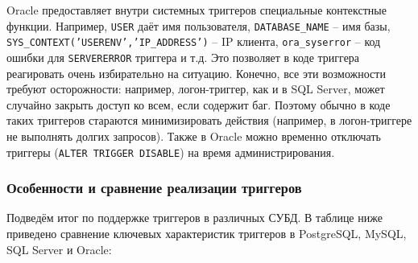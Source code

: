  Oracle предоставляет внутри системных триггеров специальные контекстные функции. Например, \texttt{USER} даёт имя пользователя, \texttt{DATABASE\_NAME} – имя базы, \texttt{SYS\_CONTEXT('USERENV','IP\_ADDRESS')} – IP клиента, \texttt{ora\_syserror} – код ошибки для \texttt{SERVERERROR} триггера и т.д. Это позволяет в коде триггера реагировать очень избирательно на ситуацию. 
 Конечно, все эти возможности требуют осторожности: например, логон-триггер, как и в SQL Server, может случайно закрыть доступ ко всем, если содержит баг. Поэтому обычно в коде таких триггеров стараются минимизировать действия (например, в логон-триггере не выполнять долгих запросов). Также в Oracle можно временно отключать триггеры (\texttt{ALTER TRIGGER DISABLE}) на время администрирования.

\subsubsection{Особенности и сравнение реализации триггеров}

Подведём итог по поддержке триггеров в различных СУБД. В таблице ниже приведено сравнение ключевых характеристик триггеров в PostgreSQL, MySQL, SQL Server и Oracle:

